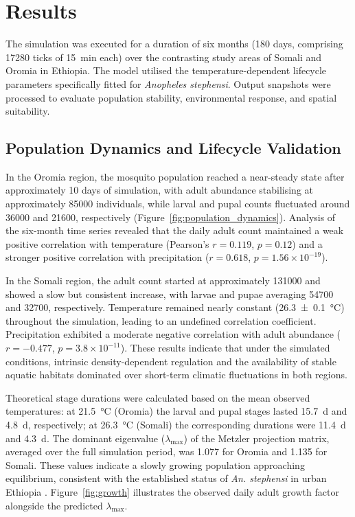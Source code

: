 \documentclass{article}
\begin{document}
\section{Results}
\label{sec:results}

The simulation was executed for a duration of six months (180 days, comprising \num{17280} ticks of \qty{15}{\minute} each) over 
the contrasting study areas of Somali and Oromia in Ethiopia. The model utilised the temperature-dependent lifecycle parameters 
specifically fitted for \textit{Anopheles stephensi}. Output snapshots were processed to evaluate population stability, environmental 
response, and spatial suitability.

\subsection{Population Dynamics and Lifecycle Validation}

In the Oromia region, the mosquito population reached a near-steady state after approximately 10 days of simulation, with adult abundance 
stabilising at approximately \num{85000} individuals, while larval and pupal counts fluctuated around \num{36000} and \num{21600}, 
respectively (Figure~\ref{fig:population_dynamics}). Analysis of the six-month time series revealed that the daily adult count maintained 
a weak positive correlation with temperature (Pearson's $r = 0.119$, $p = 0.12$) and a stronger positive correlation with 
precipitation ($r = 0.618$, $p = 1.56\times10^{-19}$).

In the Somali region, the adult count started at approximately \num{131000} and showed a slow but consistent increase, with larvae 
and pupae averaging \num{54700} and \num{32700}, respectively. Temperature remained nearly constant (\qty{26.3 \pm 0.1}{\celsius}) 
throughout the simulation, leading to an undefined correlation coefficient. Precipitation exhibited a moderate negative correlation 
with adult abundance ($r = -0.477$, $p = 3.8\times10^{-11}$). These results indicate that under the simulated conditions, intrinsic 
density-dependent regulation and the availability of stable aquatic habitats dominated over short-term climatic fluctuations in both regions.

Theoretical stage durations were calculated based on the mean observed temperatures: at \qty{21.5}{\celsius} (Oromia) the larval and 
pupal stages lasted \qty{15.7}{\day} and \qty{4.8}{\day}, respectively; at \qty{26.3}{\celsius} (Somali) the corresponding durations 
were \qty{11.4}{\day} and \qty{4.3}{\day}. The dominant eigenvalue ($\lambda_{\max}$) of the Metzler projection matrix, averaged over 
the full simulation period, was \num{1.077} for Oromia and \num{1.135} for Somali. These values indicate a slowly growing population 
approaching equilibrium, consistent with the established status of \textit{An. stephensi} in urban Ethiopia \citep{2021.MB.AUO}. 
Figure~\ref{fig:growth} illustrates the observed daily adult growth factor alongside the predicted $\lambda_{\max}$.
\end{document}
